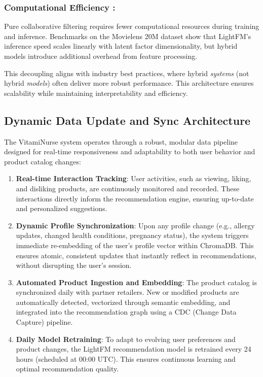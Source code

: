 \subsubsection{Computational Efficiency :}
Pure collaborative filtering requires fewer computational resources during training and inference. Benchmarks on the Movielens 20M dataset show that LightFM's inference speed scales linearly with latent factor dimensionality, but hybrid models introduce additional overhead from feature processing.


This decoupling aligns with industry best practices, where hybrid \textit{systems} (not hybrid \textit{models}) often deliver more robust performance. This architecture ensures scalability while maintaining interpretability and efficiency.

\subsection{Dynamic Data Update and Sync Architecture}

The VitamiNurse system operates through a robust, modular data pipeline designed for real-time responsiveness and adaptability to both user behavior and product catalog changes:

\begin{enumerate}
    \item \textbf{Real-time Interaction Tracking}: User activities, such as viewing, liking, and disliking products, are continuously monitored and recorded. These interactions directly inform the recommendation engine, ensuring up-to-date and personalized  suggestions.
    
    \item \textbf{Dynamic Profile Synchronization}: Upon any profile change (e.g., allergy updates, changed health conditions, pregnancy status), the system triggers immediate re-embedding of the user's profile vector within ChromaDB. This ensures atomic, consistent updates that instantly reflect in recommendations, without disrupting the user's session.
    
    \item \textbf{Automated Product Ingestion and Embedding}: The product catalog is synchronized daily with partner retailers. New or modified products are automatically detected, vectorized through semantic embedding, and integrated into the recommendation graph using a CDC (Change Data Capture) pipeline.
    
    \item \textbf{Daily Model Retraining}: To adapt to evolving user preferences and product changes, the LightFM recommendation model is retrained every 24 hours (scheduled at 00:00 UTC). This ensures continuous learning and optimal recommendation quality.
\end{enumerate}

